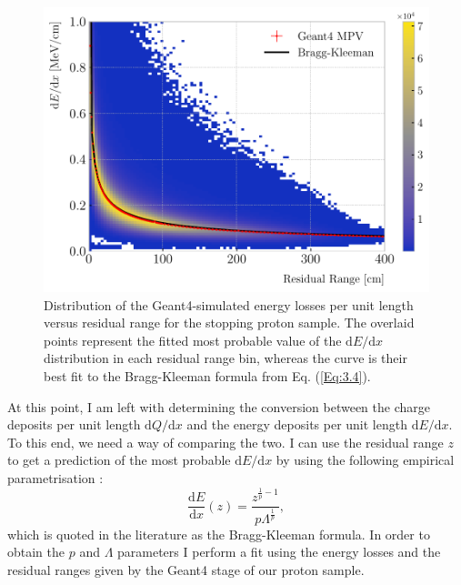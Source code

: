 \begin{figure}[t]
	\centering
	\includegraphics[width=.85\linewidth]{Images/GArSoft_PID/dEdx/bragg_kleeman_geant_langau.pdf}
	\caption[Distribution of the Geant4-simulated energy losses per unit length versus residual range for the stopping proton sample.]{Distribution of the Geant4-simulated energy losses per unit length versus residual range for the stopping proton sample. The overlaid points represent the fitted most probable value of the $\mathrm{d}E/\mathrm{d}x$ distribution in each residual range bin, whereas the curve is their best fit to the Bragg-Kleeman formula from Eq. (\ref{Eq:3.4}).}
	\label{fig:bragg_kleeman}
\end{figure}

At this point, I am left with determining the conversion between the charge deposits per unit length $\mathrm{d}Q/\mathrm{d}x$ and the energy deposits per unit length $\mathrm{d}E/\mathrm{d}x$. To this end, we need a way of comparing the two. I can use the residual range $z$ to get a prediction of the most probable $\mathrm{d}E/\mathrm{d}x$ by using the following empirical parametrisation \cite{Ulmer2010}:
\begin{equation}\label{Eq:3.4}
	\frac{\mathrm{d}E}{\mathrm{d}x}(z) = \frac{z^{\frac{1}{p}-1}}{p\Lambda^{\frac{1}{p}}},
\end{equation}
which is quoted in the literature as the Bragg-Kleeman formula. In order to obtain the $p$ and $\Lambda$ parameters I perform a fit using the energy losses and the residual ranges given by the Geant4 stage of our proton sample.


